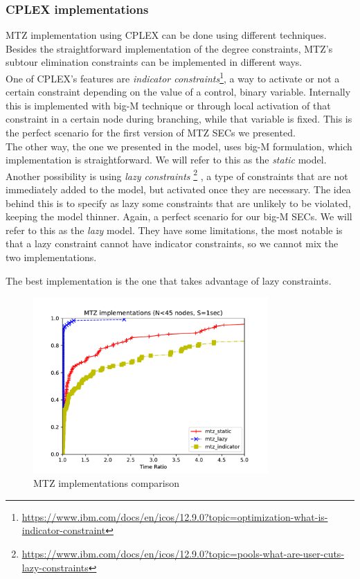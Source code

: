 \subsubsection{CPLEX implementations}
MTZ implementation using CPLEX can be done using different techniques. Besides
the straightforward implementation of the degree constraints, MTZ's subtour
elimination constraints can be implemented in different ways. \\ One of CPLEX's
features are \emph{indicator
constraints}\footnote{\href{https://www.ibm.com/docs/en/icos/12.9.0?topic=optimization-what-is-indicator-constraint}{https://www.ibm.com/docs/en/icos/12.9.0?topic=optimization-what-is-indicator-constraint}},
a way to activate or not a certain constraint depending on the value of a
control, binary variable. Internally this is implemented with big-M technique or
through local activation of that constraint in a certain node during
branching, while that variable is fixed. This is the perfect scenario for the
first version of MTZ SECs we presented. \\ 
The other way, the one we presented in the model, uses big-M formulation, which
implementation is straightforward. We will refer to this as the \emph{static}
model. \\
Another possibility is using \emph{lazy constraints}
\footnote{\href{https://www.ibm.com/docs/en/icos/12.9.0?topic=pools-what-are-user-cuts-lazy-constraints}{https://www.ibm.com/docs/en/icos/12.9.0?topic=pools-what-are-user-cuts-lazy-constraints}}
, a type of constraints that are not immediately added to the model, but
activated once they are necessary. The idea behind this is to specify as lazy
some constraints that are unlikely to be violated, keeping the model thinner.
Again, a perfect scenario for our big-M SECs. We will refer to this as the
\emph{lazy} model. They have some limitations, the most notable is that a lazy
constraint cannot have indicator constraints, so we cannot mix the two
implementations. 

\begin{claim}
    The best implementation is the one that takes advantage of lazy constraints.
\end{claim}

\begin{figure}
    \centering
    \includegraphics[width=0.8\textwidth]{figures/mtz_comp1.pdf}
    \caption{MTZ implementations comparison}
\end{figure}

